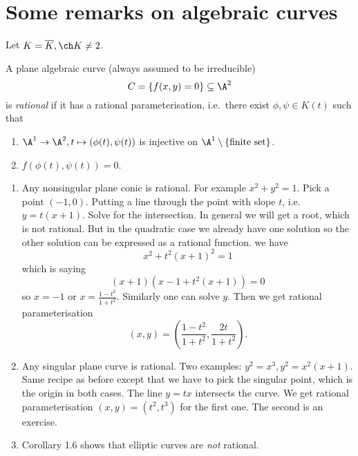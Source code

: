 \documentclass[a4paper]{article}
\theoremstyle{definition}
\begin{document}
\section{Some remarks on algebraic curves}

Let \(K = \overline K, \ch K \neq 2\).

\begin{definition}
  A plane algebraic curve (always assumed to be irreducible)
  \[
    C = \{f(x, y) = 0\} \subseteq \A^2
  \]
  is \emph{rational} if it has a rational parameterisation, i.e.\ there exist \(\phi, \psi \in K(t)\) such that
  \begin{enumerate}
  \item \(\A^1 \to \A^2, t \mapsto (\phi(t), \psi(t))\) is injective on \(\A^1 \setminus \{\text{finite set}\}\).
  \item \(f(\phi(t), \psi(t)) = 0\).
  \end{enumerate}
\end{definition}

\begin{eg}\leavevmode
  \begin{enumerate}
  \item Any nonsingular plane conic is rational. For example \(x^2 + y^2 = 1\). Pick a point \((-1, 0)\). Putting a line through the point with slope \(t\), i.e.\ \(y = t(x + 1)\). Solve for the intersection. In general we will get a root, which is not rational. But in the quadratic case we already have one solution so the other solution can be expressed as a rational function. we have
    \[
      x^2 + t^2(x + 1)^2 = 1
    \]
    which is saying
    \[
      (x + 1)(x - 1 + t^2(x + 1)) = 0
    \]
    so \(x = -1\) or \(x = \frac{1 - t^2}{1 + t^2}\). Similarly one can solve \(y\). Then we get rational parameterisation
    \[
      (x, y) = \left( \frac{1 - t^2}{1 + t^2}, \frac{2t}{1 + t^2} \right).
    \]
  \item Any singular plane curve is rational. Two examples: \(y^2 = x^3, y^2 = x^2 (x + 1)\). Same recipe as before except that we have to pick the singular point, which is the origin in both cases. The line \(y = tx\) intersects the curve. We get rational parameterisation \((x, y) = (t^2, t^3)\) for the first one. The second is an exercise.
  \item Corollary 1.6 shows that elliptic curves are \emph{not} rational.
  \end{enumerate}
\end{eg}
\end{document}
